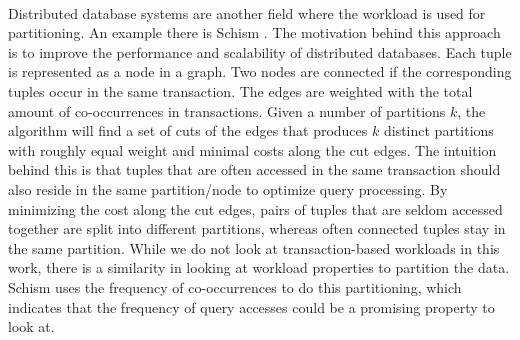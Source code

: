 \paragraph{}
Distributed database systems are another field where the workload is used for partitioning. An example there is Schism \cite{Curino2010}. The motivation behind this approach is to improve the performance and scalability of distributed databases. Each tuple is represented as a node in a graph. Two nodes are connected if the corresponding tuples occur in the same transaction. The edges are weighted with the total amount of co-occurrences in transactions. Given a number of partitions $k$, the algorithm will ﬁnd a set of cuts of the edges that produces $k$ distinct partitions with roughly equal weight and minimal costs along the cut edges. The intuition behind this is that tuples that are often accessed in the same transaction should also reside in the same partition/node to optimize query processing. By minimizing the cost along the cut edges, pairs of tuples that are seldom accessed together are split into diﬀerent partitions, whereas often connected tuples stay in the same partition. While we do not look at transaction-based workloads in this work, there is a similarity in looking at workload properties to partition the data. Schism uses the frequency of co-occurrences to do this partitioning, which indicates that the frequency of query accesses could be a promising property to look at.

